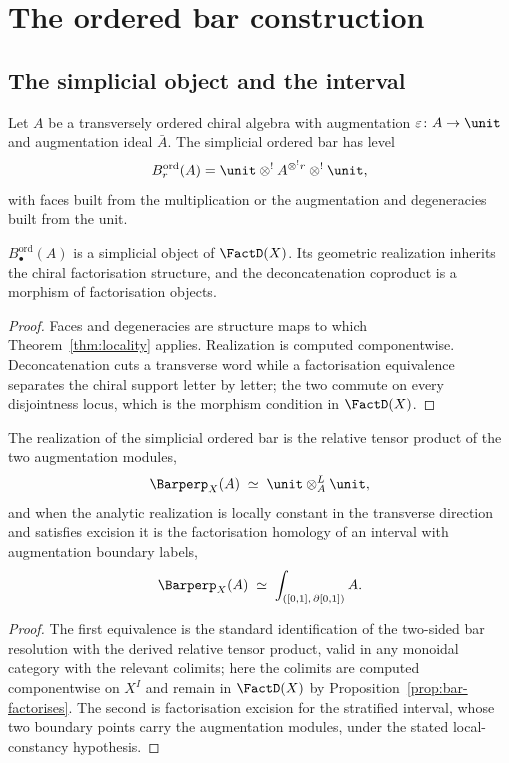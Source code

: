 \chapter{The ordered bar construction}
\label{ch:ordered-bar}

\section{The simplicial object and the interval}

Let $A$ be a transversely ordered chiral algebra with augmentation
$\varepsilon\colon A\to\unit$ and augmentation ideal $\bar A$. The
simplicial ordered bar has level
\[
  B^{\mathrm{ord}}_r(A) = \unit\otimes^! A^{\otimes^! r}\otimes^!\unit,
\]
with faces built from the multiplication or the augmentation and
degeneracies built from the unit.

\begin{proposition}
\label{prop:bar-factorises}
\StatusProved{} $B^{\mathrm{ord}}_\bullet(A)$ is a simplicial object of
$\FactD(X)$. Its geometric realization inherits the chiral factorisation
structure, and the deconcatenation coproduct is a morphism of
factorisation objects.
\end{proposition}

\begin{proof}
Faces and degeneracies are structure maps to which
Theorem~\ref{thm:locality} applies. Realization is computed
componentwise. Deconcatenation cuts a transverse word while a
factorisation equivalence separates the chiral support letter by letter;
the two commute on every disjointness locus, which is the morphism
condition in $\FactD(X)$.
\end{proof}

\begin{theorem}
\label{thm:interval}
\StatusProved{} The realization of the simplicial ordered bar is the
relative tensor product of the two augmentation modules,
\[
  \Barperp_X(A) \;\simeq\; \unit\otimes^{L}_A\unit ,
\]
and when the analytic realization is locally constant in the transverse
direction and satisfies excision it is the factorisation homology of an
interval with augmentation boundary labels,
\[
  \Barperp_X(A) \;\simeq\; \int_{([0,1],\,\partial[0,1])} A .
\]
\end{theorem}

\begin{proof}
The first equivalence is the standard identification of the two-sided bar
resolution with the derived relative tensor product, valid in any
monoidal category with the relevant colimits; here the colimits are
computed componentwise on $X^I$ and remain in $\FactD(X)$ by
Proposition~\ref{prop:bar-factorises}. The second is factorisation
excision for the stratified interval, whose two boundary points carry the
augmentation modules, under the stated local-constancy hypothesis.
\end{proof}


